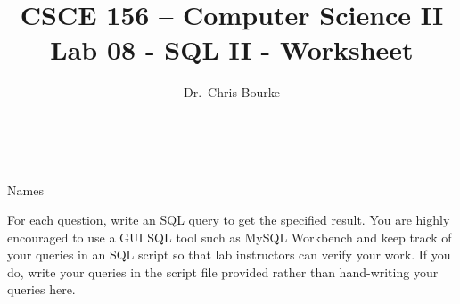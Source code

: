 \documentclass[12pt]{exam}
\title{CSCE 156 -- Computer Science II \\
{\large Lab 08 - SQL II - Worksheet}}
\author{Dr.\ Chris Bourke}
\date{~}
\begin{document}
\maketitle

{\Large Names \underline{\hspace*{5cm}}}

For each question, write an SQL query to get the specified result.  You are highly 
encouraged to use a GUI SQL tool such as MySQL Workbench and keep track of your 
queries in an SQL script so that lab instructors can verify your work.  If you do, 
write your queries in the script file provided rather than hand-writing your queries 
here.

\end{document}
